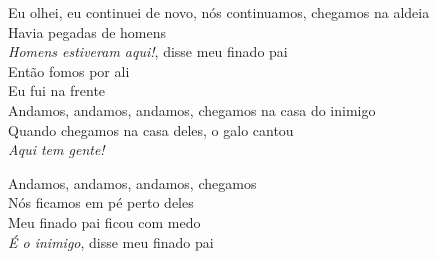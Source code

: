 \begin{linenumbers}\begingroup\raggedright
 
\noindent   Eu olhei, eu continuei de novo, nós continuamos, chegamos na aldeia\\
  Havia pegadas de homens\\
  \emph{Homens estiveram aqui!}, disse meu finado pai\\
  Então fomos por ali\\
  Eu fui na frente\\
  Andamos, andamos, andamos, chegamos na casa do inimigo\\
  Quando chegamos na casa deles, o galo cantou\\
  \emph{Aqui tem gente!}
 
\end{linenumbers}\endgroup

\bigskip

\begin{linenumbers}\begingroup\raggedright
 
\noindent   Andamos, andamos, andamos, chegamos\\
  Nós ficamos em pé perto deles\\
  Meu finado pai ficou com medo\\
  \emph{É o inimigo}, disse meu finado pai
 
\end{linenumbers}\endgroup

\bigskip

